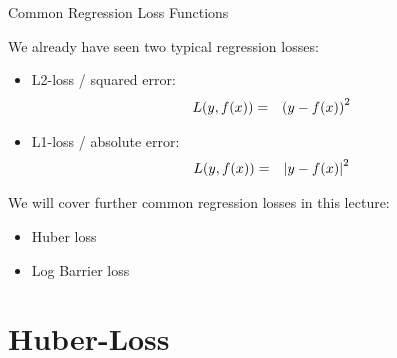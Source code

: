 \begin{vbframe}{Common Regression Loss Functions}

We already have seen two typical regression losses: 

\begin{itemize}
  \item L2-loss / squared error: 
  \begin{eqnarray*}
    L(y, f(x)) &=& \left(y - f(x)\right)^2
  \end{eqnarray*}
  \item L1-loss / absolute error: 
  \begin{eqnarray*}
    L(y, f(x)) &=& \left|y - f(x)\right|^2
  \end{eqnarray*}  
\end{itemize}

We will cover further common regression losses in this lecture: 

\begin{itemize}
  \item Huber loss
  \item Log Barrier loss
\end{itemize}

\end{vbframe}



\section{Huber-Loss}


